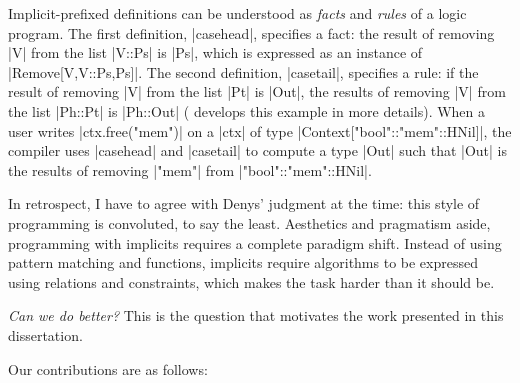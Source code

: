 \memImplicitRemove

\noindent
Implicit-prefixed definitions can be understood as \emph{facts} and \emph{rules} of a logic program.
The first definition, |casehead|, specifies a fact: the result of removing |V| from the list |V::Ps| is |Ps|, which is expressed as an instance of |Remove[V,V::Ps,Ps]|.
The second definition, |casetail|, specifies a rule: if the result of removing |V| from the list |Pt| is |Out|, the results of removing |V| from the list |Ph::Pt| is |Ph::Out| ( develops this example in more details).
When a user writes |ctx.free("mem")| on a |ctx| of type |Context["bool"::"mem"::HNil]|, the compiler uses |casehead| and |casetail| to compute a type |Out| such that |Out| is the results of removing |"mem"| from |"bool"::"mem"::HNil|.

In retrospect, I have to agree with Denys' judgment at the time: this style of programming is convoluted, to say the least.
Aesthetics and pragmatism aside, programming with implicits requires a complete paradigm shift.
Instead of using pattern matching and functions, implicits require algorithms to be expressed using relations and constraints, which makes the task harder than it should be.

\emph{Can we do better?} This is the question that motivates the work presented in this dissertation.

Our contributions are as follows:

